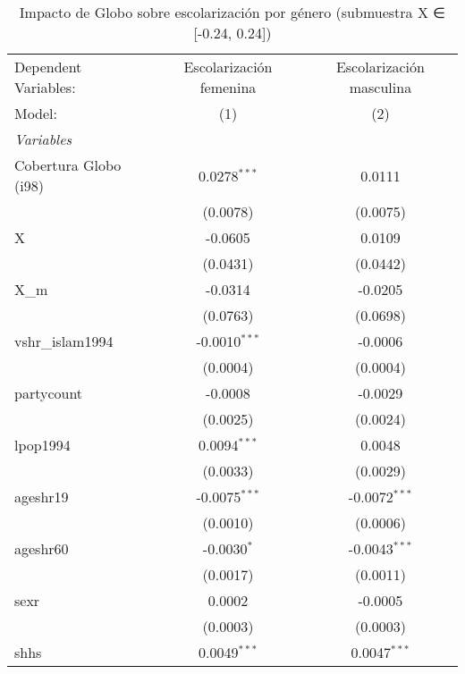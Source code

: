 
\begin{table}[htbp]
   \caption{Impacto de Globo sobre escolarización por género (submuestra X ∈ [-0.24, 0.24])}
   \centering
   \begin{tabular}{lcc}
      \tabularnewline \midrule \midrule
      Dependent Variables:  & Escolarización femenina & Escolarización masculina\\  
      Model:                & (1)                     & (2)\\  
      \midrule
      \emph{Variables}\\
      Cobertura Globo (i98) & 0.0278$^{***}$          & 0.0111\\   
                            & (0.0078)                & (0.0075)\\   
      X                     & -0.0605                 & 0.0109\\   
                            & (0.0431)                & (0.0442)\\   
      X\_m                  & -0.0314                 & -0.0205\\   
                            & (0.0763)                & (0.0698)\\   
      vshr\_islam1994       & -0.0010$^{***}$         & -0.0006\\   
                            & (0.0004)                & (0.0004)\\   
      partycount            & -0.0008                 & -0.0029\\   
                            & (0.0025)                & (0.0024)\\   
      lpop1994              & 0.0094$^{***}$          & 0.0048\\   
                            & (0.0033)                & (0.0029)\\   
      ageshr19              & -0.0075$^{***}$         & -0.0072$^{***}$\\   
                            & (0.0010)                & (0.0006)\\   
      ageshr60              & -0.0030$^{*}$           & -0.0043$^{***}$\\   
                            & (0.0017)                & (0.0011)\\   
      sexr                  & 0.0002                  & -0.0005\\   
                            & (0.0003)                & (0.0003)\\   
      shhs                  & 0.0049$^{***}$          & 0.0047$^{***}$\\   

\end{tabular}
\end{table}
